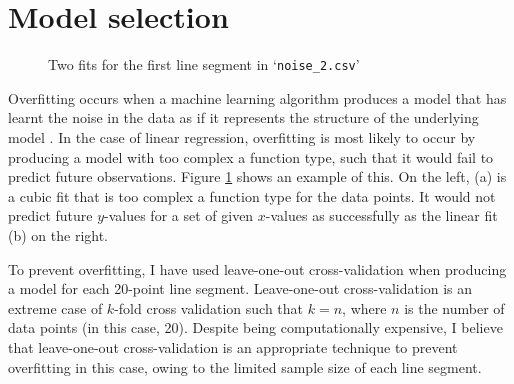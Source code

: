 \documentclass[onecolumn, 12pt, a4paper]{article}
\begin{document}
\section{Model selection}

\begin{figure}[htbp]
    \centering
    \hfill
    \caption{Two fits for the first line segment in `\texttt{noise\_2.csv}'}
    \label{fig:noise_2.csv}
\end{figure}

Overfitting occurs when a machine learning algorithm
produces a model that has learnt the noise in the data
as if it represents the structure of the underlying
model \cite{MSMI}.
In the case of linear regression, overfitting is most
likely to occur by producing a model with too complex a function
type, such that it would fail to predict future observations.
Figure \ref{fig:noise_2.csv} shows an example of this. 
On the left, (a) is a cubic fit that is too complex a 
function type for the data points.
It would not predict future $y$-values for a set of 
given $x$-values as successfully as the linear fit (b) on 
the right.

To prevent overfitting, I have used leave-one-out
cross-validation when producing a model for each 20-point
line segment. Leave-one-out cross-validation is 
an extreme case of $k$-fold cross validation
such that $k = n$, where
$n$ is the number of data points (in this case, 20).
Despite being computationally expensive, I believe that
leave-one-out cross-validation is an appropriate technique
to prevent overfitting in this case,
owing to the limited sample size of each line segment.
\end{document}
